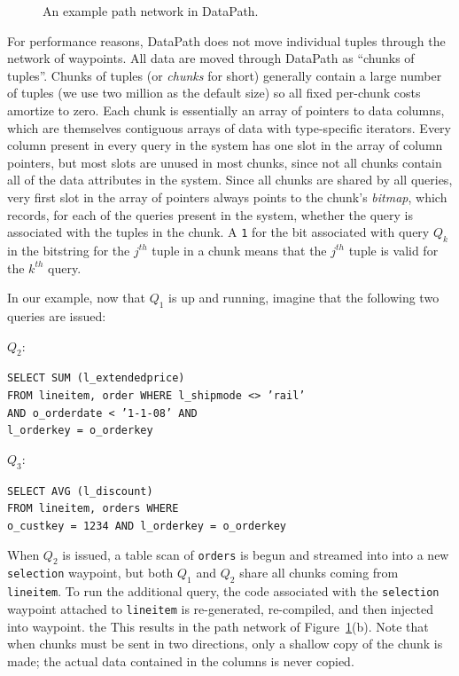 \documentclass{sig-alternate}
\renewcommand\:{\colon} %
\begin{document}
\begin{figure} [t!]
\vspace{-5 pt}
 \caption{An example path network in DataPath.}  
\vspace{-8 pt}
\label{fig:network}
\end{figure}

For performance reasons, DataPath does not move individual tuples through the network of waypoints.
All data are moved through DataPath as ``chunks of tuples''.
Chunks of tuples (or \emph{chunks} for short)
generally contain a large number of tuples (we use two million as the default size) so all fixed per-chunk costs
amortize to zero.  Each chunk is essentially an array of pointers to data columns, which are themselves contiguous arrays of
data with type-specific iterators.  Every column present in every query in the system
has one slot in the array of column pointers,
but most slots are unused in most chunks, since not all chunks contain all of the data
attributes in the system. Since all chunks are shared by all queries, very first slot
in the array of pointers
always points to the chunk's \emph{bitmap}, which records, for each of the queries present in the system, whether the query is
associated with the tuples in the chunk.  A \texttt{1} for the bit associated
with query $Q_k$ in the bitstring for the $j^{th}$ tuple in a chunk
means that the $j^{th}$ tuple is valid for
the $k^{th}$ query.  

In our example, now that $Q_1$ is up and 
running, imagine that the following two queries are issued:

\vspace{5 pt} \noindent $Q_2$: \begin{small} \texttt{SELECT SUM (l\_extendedprice)}\\
\noindent \texttt{FROM lineitem, order WHERE l\_shipmode <> 'rail'}\\
\noindent \texttt{AND o\_orderdate < '1-1-08' AND}\\
\noindent \texttt{l\_orderkey = o\_orderkey} \end{small}

\vspace{5 pt} \noindent $Q_3$: \begin{small} \texttt{SELECT AVG (l\_discount)}\\
\noindent \texttt{FROM lineitem, orders WHERE}\\
\noindent \texttt{o\_custkey = 1234 AND l\_orderkey = o\_orderkey} \end{small}

\vspace{5 pt} \noindent
When $Q_2$ is issued, a table scan of \texttt{orders} is begun and streamed into
into a new \texttt{selection} waypoint, but both $Q_1$ and $Q_2$ share all chunks
coming from \texttt{lineitem}.  To run the additional query, the code associated with the
\texttt{selection} waypoint attached to \texttt{lineitem} is re-generated,
re-compiled, and then injected into waypoint.
the This results in the path network of Figure~\ref{fig:network}(b).
Note that when chunks must be sent in two directions, only a shallow copy of the chunk is made; the actual data
contained in the columns is never copied.
\end{document}
